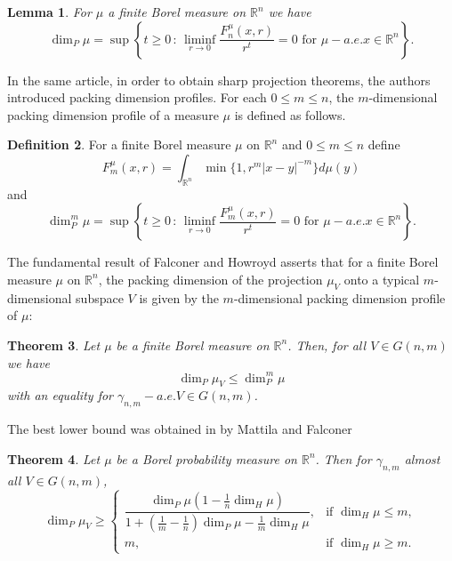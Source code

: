\documentclass[12pt]{amsart}
\newtheorem{theorem}{Theorem}[section]
\newtheorem{lemma}[theorem]{Lemma}
\theoremstyle{definition}
\newtheorem{definition}[theorem]{Definition}
\theoremstyle{remark}
\numberwithin{equation}{section}
\begin{document}
\begin{lemma}\cite[Corollary 3]{falconer1997packing}
    For $\mu$ a finite Borel measure on $\mathbb{R}^n$ we have
    $$\dim_P \mu = \sup\left\{ t\geq 0\, :\, \liminf_{r\to 0}\frac{F_n^{\mu}(x,r)}{r^t}=0 \text{ for }\mu-a.e.x\in\mathbb{R}^n\right\}.$$
\end{lemma}


In the same article, in order to obtain sharp projection theorems, the authors introduced packing dimension profiles. For each $0 \leq m \leq n$, the $m$-dimensional packing dimension profile of a measure $\mu$ is defined as follows.

\begin{definition}
    For a finite Borel measure $\mu$ on $\mathbb{R}^n$ and $0\leq m\leq n$ define
    $$F_m^\mu (x,r)=\int_{\mathbb{R}^n} \min \{1,r^m|x-y|^{-m}\}d\mu(y)$$
    and 
   $$\dim_P^m \mu = \sup\left\{ t\geq 0\, :\, \liminf_{r\to 0}\frac{F_m^{\mu}(x,r)}{r^t}=0 \text{ for }\mu-a.e.x\in\mathbb{R}^n\right\}.$$
\end{definition}

The fundamental result of Falconer and Howroyd asserts that for a finite Borel measure $\mu$ on $\mathbb{R}^n$, the packing dimension of the projection $\mu_V$ onto a typical $m$-dimensional subspace $V$ is given by the $m$-dimensional packing dimension profile of $\mu$:

\begin{theorem}\label{ProjPacking}\cite[Theorem 6]{falconer1997packing}
    Let $\mu$ be a finite Borel measure on $\mathbb{R}^n$. Then, for all $V\in G(n,m)$ we have
    $$\dim_P \mu_V \leq \dim_P^m \mu $$
    with an equality for $\gamma_{n,m}-a.e.V\in G(n,m)$.
\end{theorem}




The best lower bound was obtained in \cite{falconer1996packing} by Mattila and Falconer

\begin{theorem}\cite[Theorem 3.3]{falconer1996packing}
    Let $\mu$ be a Borel probability measure on $\mathbb{R}^n$. Then for $\gamma_{n,m}$ almost all $V\in G(n,m)$, 
    \[
\dim_P \mu_V \ge 
\begin{cases}
\dfrac{\dim_P \mu\left(1-\frac{1}{n}\dim_H \mu\right)}
{1+\left(\frac{1}{m}-\frac{1}{n}\right)\dim_P \mu-\frac{1}{m}\dim_H \mu},
& \text{if } \dim_H \mu \le m, \\[1.2em]
m, & \text{if } \dim_H \mu \ge m.
\end{cases}
\]
\end{theorem}
\end{document}
